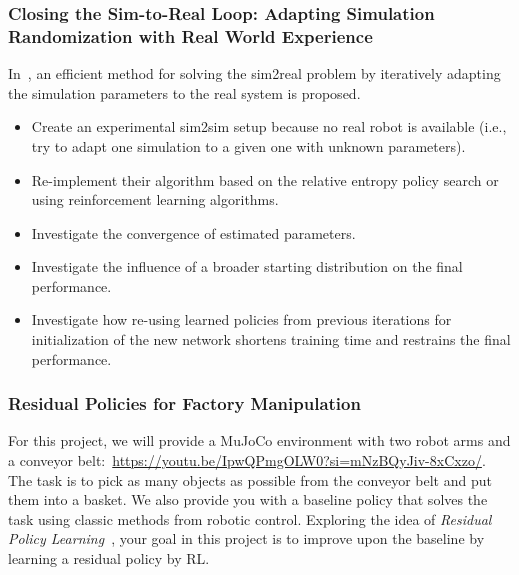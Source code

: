 \documentclass[a4paper]{article}
\begin{document}
\subsubsection{Closing the Sim-to-Real Loop: Adapting Simulation Randomization with Real World Experience}
In~\citet{Chebotar2018}, an efficient method for solving the sim2real problem by iteratively adapting the simulation parameters to the real system is proposed.
\begin{itemize}
  \item Create an experimental sim2sim setup because no real robot is available (i.e., try to adapt one simulation to a given one with unknown parameters).
  \item Re-implement their algorithm based on the relative entropy policy search or using reinforcement learning algorithms.
  \item Investigate the convergence of estimated parameters.
  \item Investigate the influence of a broader starting distribution on the final performance.
  \item Investigate how re-using learned policies from previous iterations for initialization of the new network shortens training time and restrains the final performance.
\end{itemize}


\subsubsection{Residual Policies for Factory Manipulation}

For this project, we will provide a MuJoCo environment with two robot arms and a conveyor belt:~\url{https://youtu.be/IpwQPmgOLW0?si=mNzBQyJiv-8xCxzo/}.
The task is to pick as many objects as possible from the conveyor belt and put them into a basket. 
We also provide you with a baseline policy that solves the task using classic methods from robotic control.
Exploring the idea of \textit{Residual Policy Learning}~\cite{Silver2018-kz}, your goal in this project is to improve upon the baseline by learning a residual policy by RL.

\end{document}

